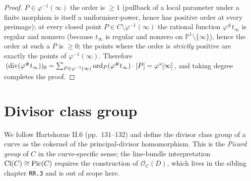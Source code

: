 \begin{proof}
  \(P \in \varphi^{-1}(\infty)\) the order is \(\geq 1\) (pullback of a local
  parameter under a finite morphism is itself a uniformiser-power, hence
  has positive order at every preimage); at every closed point
  \(P \in C \setminus \varphi^{-1}(\infty)\) the rational function
  \(\varphi^{\#} t_\infty\) is regular and nonzero (because \(t_\infty\) is
  regular and nonzero on \(\mathbb P^1 \setminus \{\infty\}\)), hence the
  order at such a \(P\) is \(\geq 0\); the points where the order is
  \emph{strictly} positive are exactly the points of \(\varphi^{-1}(\infty)\).
  Therefore
  \(\,(\mathrm{div}(\varphi^{\#} t_\infty))_0 = \sum_{P \in \varphi^{-1}(\infty)}
  \operatorname{ord}_P(\varphi^{\#} t_\infty) \cdot [P] = \varphi^{*}[\infty]\,\), and
  taking degree completes the proof.
\end{proof}
\section{Divisor class group}
We follow Hartshorne II.6 (pp.~131--132) and define the divisor class group
of a curve as the cokernel of the principal-divisor homomorphism. This is
the \emph{Picard group} of \(C\) in the curve-specific sense; the line-bundle
interpretation \(\operatorname{Cl}(C) \cong \operatorname{Pic}(C)\) requires the construction of
\(\mathcal O_C(D)\), which lives in the sibling chapter \texttt{RR.3} and is
out of scope here.
